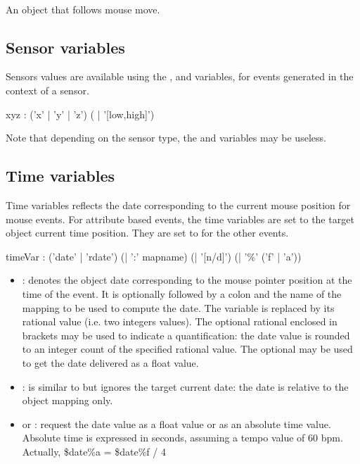 \documentclass[a4paper,twoside]{report}
\newcommand{\subsublevel}[1]	{\subsection{#1}}
\begin{document}
\example \\
An object that follows mouse move.\\


\subsublevel{Sensor variables}
\label{sensorvar}

Sensors values are available using the ,  and  variables, for events generated in the context of a sensor.
\begin{rail} 
xyz : ('x' | 'y' | 'z') ( | '[low,high]') 
\end{rail}
Note that depending on the sensor type, the  and  variables may be useless.


\subsublevel{Time variables}
\label{timevar}

Time variables reflects the date corresponding to the current mouse position for mouse events. For attribute based events, the time variables are set to the target object current time position.
They are set to  for the other events. 


\begin{rail} 
timeVar :  ('date' | 'rdate') (| ':'  mapname) (| '[n/d]') (| '\%' ('f' | 'a'))
\end{rail}

\begin{itemize}
\item {}: denotes the object date corresponding to the mouse pointer position at the time of the event. It is optionally followed by a colon and the name of the mapping to be used to compute the date. The  variable is replaced by its rational value (i.e. two integers values). The optional rational enclosed in brackets may be used to indicate a quantification: the date value is rounded to an integer count of the specified rational value. The optional  may be used to get the date delivered as a float value.
\item {}: is similar to  but ignores the target current date: the date is relative to the object mapping only.
\item {} or : request the date value as a float value or as an absolute time value. Absolute time is expressed in seconds, assuming a tempo value of 60 bpm. Actually, \$date\%a = \$date\%f / 4
\end{itemize}
\end{document}
